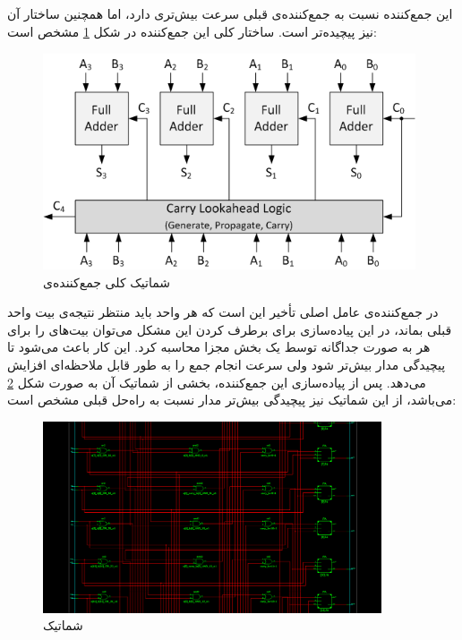 \documentclass{article}
\begin{document}
\pagebreak
\subsection{}
این جمع‌کننده نسبت به جمع‌کننده‌ی قبلی سرعت بیش‌تری دارد، اما همچنین ساختار آن نیز پیچیده‌تر است. ساختار کلی این جمع‌کننده در شکل \ref{fig:cla-schem} مشخص است:
\begin{figure}[H]
\centering
\includegraphics[width=11cm]{carry_lookahead_adder}
\caption{شماتیک کلی جمع‌کننده‌ی }
\label{fig:cla-schem}
\end{figure}
\noindent
در جمع‌کننده‌ی  عامل اصلی تأخیر این است که هر واحد باید منتظر نتیجه‌ی بیت  واحد قبلی بماند، در این پیاده‌سازی برای برطرف کردن این مشکل می‌توان بیت‌های  را برای هر  به صورت جداگانه توسط یک بخش مجزا محاسبه کرد. این کار باعث می‌شود تا پیچیدگی مدار بیش‌تر شود ولی سرعت انجام جمع را به طور قابل ملاحظه‌ای افزایش می‌دهد.
پس از پیاده‌سازی این جمع‌کننده، بخشی از شماتیک  آن به صورت شکل \ref{fig:cla-adder-rtl} می‌باشد، از این شماتیک نیز پیچیدگی بیش‌تر مدار نسبت به راه‌حل قبلی مشخص است:
\begin{figure}[H]
\centering
\includegraphics[width=10cm]{cla-adder-rtl}
\caption{شماتیک }
\label{fig:cla-adder-rtl}
\end{figure}
\end{document}
